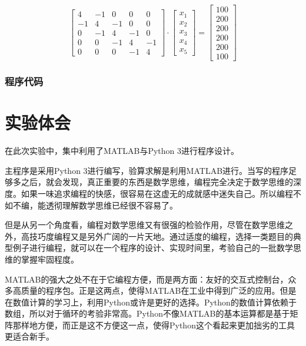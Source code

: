 \begin{equation}
\left[ \begin{array}{rrrrr}{4} & {-1} & {0} & {0} & {0} \\ {-1} & {4} & {-1} & {0} & {0} \\ {0} & {-1} & {4} & {-1} & {0} \\ {0} & {0} & {-1} & {4} & {-1} \\ {0} & {0} & {0} & {-1} & {4}\end{array}\right] \cdot \left[ \begin{array}{c}{x_{1}} \\ {x_{2}} \\ {x_{3}} \\ {x_{4}} \\ {x_{5}}\end{array}\right]=\left[ \begin{array}{c}{100} \\ {200} \\ {200} \\ {200} \\ {200} \\ {100}\end{array}\right]
\end{equation}

\subsubsection{程序代码}


\section{实验体会}

在此次实验中，集中利用了MATLAB与Python 3进行程序设计。

主程序是采用Python 3进行编写，验算求解是利用MATLAB进行。当写的程序足够多之后，就会发现，真正重要的东西是数学思维，编程完全决定于数学思维的深度。如果一味追求编程的快感，很容易在这虚无的成就感中迷失自己。所以编程不如不编，能透彻理解数学思维已经很不容易了。

但是从另一个角度看，编程对数学思维又有很强的检验作用，尽管在数学思维之外，高技巧度编程又是另外广阔的一片天地。通过适度的编程，选择一类题目的典型例子进行编程，就可以在一个程序的设计、实现时间里，考验自己的一批数学思维的掌握牢固程度。

MATLAB的强大之处不在于它编程方便，而是两方面：友好的交互式控制台，众多高质量的程序包。正是这两点，使得MATLAB在工业中得到广泛的应用。但是在数值计算的学习上，利用Python或许是更好的选择。Python的数值计算依赖于数组，所以对于循环的考验非常高。Python不像MATLAB的基本运算都是基于矩阵那样地方便，而正是这不方便这一点，使得Python这个看起来更加拙劣的工具更适合新手。

